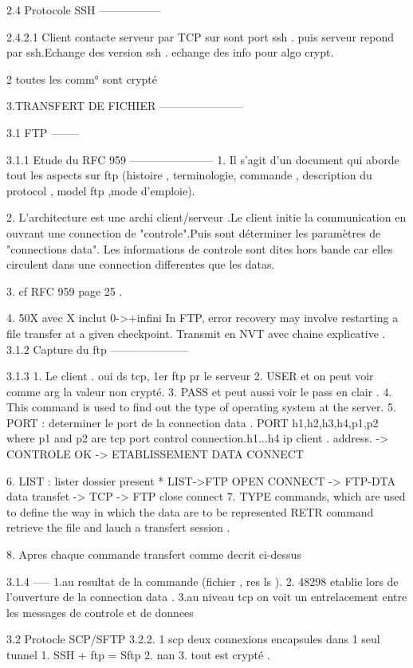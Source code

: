 2.4 Protocole SSH
-----------------

2.4.2.1 Client contacte serveur par TCP sur sont port ssh . puis serveur repond par ssh.Echange des version ssh . echange des info pour algo crypt.

2 toutes les comm° sont crypté

3.TRANSFERT DE FICHIER
-----------------------

3.1 FTP
--------

3.1.1 Etude du RFC 959 
-----------------------
1. Il s'agit d'un document qui aborde tout les aspects sur ftp (histoire , terminologie, commande , description du protocol , model ftp ,mode d'emploie).

2. L'architecture est une archi client/serveur .Le client initie la communication en ouvrant une connection de "controle".Puis sont déterminer les paramètres de "connections data". Les informations de controle sont dites hors bande car elles circulent dans une connection differentes que les datas.
 
3. cf RFC 959 page 25 .

4. 50X avec X inclut {0->+infini}
In FTP, error recovery may involve restarting a file transfer at a
given checkpoint.
Transmit en NVT avec chaine explicative .
3.1.2 Capture du ftp
---------------------

3.1.3
1. Le client . oui ds tcp, 1er ftp pr le serveur
2. USER et on peut voir comme arg la valeur non crypté. 
3. PASS et peut aussi voir le pass en clair .
4.  This command is used to find out the type of operating system at the server.
5. PORT : determiner le port de la connection data . 
PORT h1,h2,h3,h4,p1,p2
where p1 and p2 are tcp port control connection.h1...h4 ip client .
address.
-> CONTROLE OK -> ETABLISSEMENT DATA CONNECT

6. LIST : lister dossier present *
	LIST->FTP OPEN CONNECT -> FTP-DTA data transfet -> TCP -> FTP close connect
7. TYPE commands, which are used to
define the way in which the data are to be represented
	RETR command retrieve the file and lauch a transfert session .
	
8. Apres chaque commande transfert comme decrit ci-dessus 


3.1.4 
-----
1.au resultat de la commande (fichier , res ls ).
2. 48298 etablie lors de l'ouverture de la connection data .
3.au niveau tcp on voit un entrelacement entre les messages de controle et de donnees

3.2 Protocle SCP/SFTP
3.2.2.
1 scp deux connexions encapsules dans 1 seul tunnel
1. SSH + ftp = Sftp 
2. nan
3. tout est crypté .

